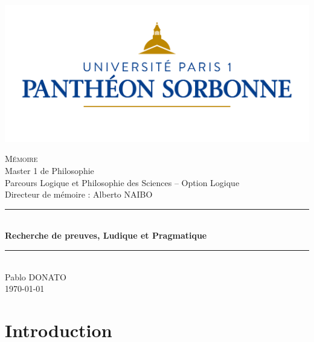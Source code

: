 \documentclass[11pt]{report}
\begin{document}
\begin{center}
    \newcommand{\HRule}{\rule{\linewidth}{0.5mm}}

    \includegraphics[scale=0.25]{img/logo-paris1.jpg}
    \vspace{1.5cm}

    \textsc{\LARGE Mémoire}\\[0.5cm]
    {Master 1 de Philosophie}\\
    {Parcours Logique et Philosophie des Sciences -- Option Logique}\\[0.5cm]
    {Directeur de mémoire : Alberto NAIBO}\\[1cm]

    \HRule \\[1.0cm]
    {\huge\bf Recherche de preuves, Ludique et Pragmatique}\\[0.5cm]
    \HRule \\[1.8cm]

    {\Large Pablo DONATO}\\[2.5cm]

    {\large \today}
\end{center}

\clearpage
{}
\thispagestyle{empty}
\null
\newpage

\tableofcontents

\chapter*{Introduction}
\end{document}
